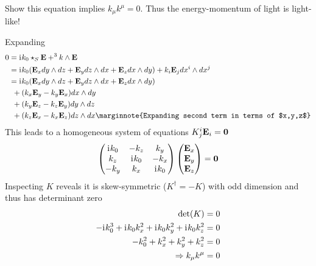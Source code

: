 \documentclass[10pt]{article}
\begin{document}
\begin{example}
	Show this equation implies $k_\mu k^\mu = 0$. Thus the energy-momentum of light is light-like!
\end{example}
\sol Expanding
$$
\begin{aligned}
	0 &= \di k_0 \star_S {\bf E} + ^3k\wedge {\bf E}\\
	&= \di k_0({\bf E}_xdy \wedge dz + {\bf E}_ydz \wedge dx + {\bf E}_zdx \wedge dy) + k_i{\bf E}_jdx^i \wedge dx^j\\
	&= \di k_0({\bf E}_xdy \wedge dz + {\bf E}_ydz \wedge dx + {\bf E}_zdx \wedge dy)\\
	&\:\:+ (k_x{\bf E}_y - k_y{\bf E}_x)dx \wedge dy\\
	&\:\:+ (k_y{\bf E}_z - k_z{\bf E}_y)dy \wedge dz\\
	&\:\:+ (k_z{\bf E}_x - k_x{\bf E}_z)dz \wedge dx\marginnote{Expanding second term in terms of $x,y,z$}\\
\end{aligned}
$$
This leads to a homogeneous system of equations $K^i_j{\bf E}_i = {\bf 0}$
$$
\begin{pmatrix}
	\mathrm{i}\mkern1mu k_0		&-k_z		&k_y\\
	k_z			&\mathrm{i}\mkern1mu k_0	&-k_x\\
	-k_y		&k_x		&\mathrm{i}\mkern1mu k_0\\
\end{pmatrix}
\begin{pmatrix}
	{\bf E}_x\\{\bf E}_y\\{\bf E}_z
\end{pmatrix} = {\bf 0}
$$
Inspecting $K$ reveals it is skew-symmetric ($K^\dag = -K$) with odd dimension and thus has determinant zero
$$
\begin{aligned}
	\det(K) &= 0\\
	-\mathrm{i}\mkern1mu k_0^3 + \mathrm{i}\mkern1mu k_0k_x^2 + \mathrm{i}\mkern1mu k_0k_y^2 + \mathrm{i}\mkern1mu k_0k_z^2 &= 0\\
	-k_0^2 + k_x^2 + k_y^2 + k_z^2 &= 0\\
	\Rightarrow k_\mu k^\mu &= 0
\end{aligned}
$$
\end{document}
